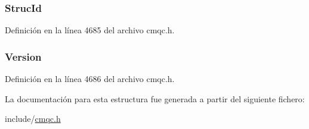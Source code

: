 \hypertarget{structtag_m_q_m_h_b_o_a0530922ca944569b52601d74941f96e4}{}
\subsubsection[{Struc\+Id}]{ Struc\+Id}\label{structtag_m_q_m_h_b_o_a0530922ca944569b52601d74941f96e4}


Definición en la línea 4685 del archivo cmqc.\+h.

\hypertarget{structtag_m_q_m_h_b_o_a0656ef8f766b3907d394d88a35d7b7e9}{}
\subsubsection[{Version}]{ Version}\label{structtag_m_q_m_h_b_o_a0656ef8f766b3907d394d88a35d7b7e9}


Definición en la línea 4686 del archivo cmqc.\+h.



La documentación para esta estructura fue generada a partir del siguiente fichero\+:\begin{DoxyCompactItemize}
\item 
include/\hyperlink{cmqc_8h}{cmqc.\+h}\end{DoxyCompactItemize}
